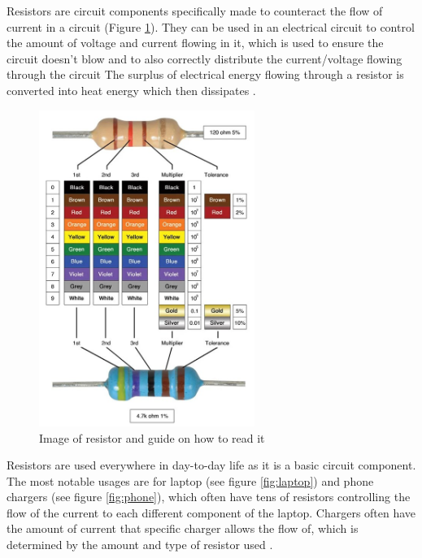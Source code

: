 \documentclass[12pt]{article}
\begin{document}
Resistors are circuit components specifically made to counteract the flow of current in a circuit
\cite{britresistor,bbcresistance,hiokiresistance} (Figure \ref{fig:resistor}).
They can be used in an electrical circuit to control the amount of voltage and current flowing in it, which is used to ensure the circuit doesn't blow and to also 
correctly distribute the current/voltage flowing through the circuit
\cite{britresistor,hiokiresistance}
The surplus of electrical energy flowing through a resistor is converted into heat energy which then dissipates
\cite{hiokiresistance}.

\begin{figure}[H]
    \centering
    \includegraphics[width=7cm]{resistorr.jpg}
    \caption{\centering Image of resistor and guide on how to read it \protect\cite{resistorpic}}
    \label{fig:resistor}
\end{figure}

Resistors are used everywhere in day-to-day life as it is a basic circuit component. The most notable usages are for laptop (see figure \ref{fig:laptop}) and phone chargers (see figure \ref{fig:phone}),
which often have tens of resistors controlling the flow of the current to each different component of the laptop. Chargers often have the amount of current that
specific charger allows the flow of, which is determined by the amount and type of resistor used \cite{resistorapp}.
\end{document}
